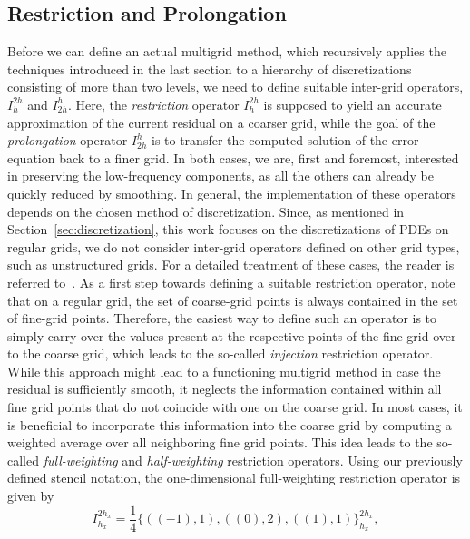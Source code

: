 \subsection{Restriction and Prolongation}
\label{subsec:restriction-and-prolongation}
Before we can define an actual multigrid method, which recursively applies the techniques introduced in the last section to a hierarchy of discretizations consisting of more than two levels, we need to define suitable inter-grid operators, $I_{h}^{2h}$ and $I_{2h}^{h}$.
Here, the \emph{restriction} operator $I_{h}^{2h}$ is supposed to yield an accurate approximation of the current residual on a coarser grid, while the goal of the \emph{prolongation} operator $I_{2h}^{h}$ is to transfer the computed solution of the error equation back to a finer grid.
In both cases, we are, first and foremost, interested in preserving the low-frequency components, as all the others can already be quickly reduced by smoothing.
In general, the implementation of these operators depends on the chosen method of discretization. 
Since, as mentioned in Section~\ref{sec:discretization}, this work focuses on the discretizations of PDEs on regular grids, we do not consider inter-grid operators defined on other grid types, such as unstructured grids.
For a detailed treatment of these cases, the reader is referred to~\cite{trottenberg2000multigrid,ruge1987algebraic,stuben2001introduction}.
As a first step towards defining a suitable restriction operator, note that on a regular grid, the set of coarse-grid points is always contained in the set of fine-grid points.
Therefore, the easiest way to define such an operator is to simply carry over the values present at the respective points of the fine grid over to the coarse grid, which leads to the so-called \emph{injection} restriction operator.
While this approach might lead to a functioning multigrid method in case the residual is sufficiently smooth, it neglects the information contained within all fine grid points that do not coincide with one on the coarse grid.
In most cases, it is beneficial to incorporate this information into the coarse grid by computing a weighted average over all neighboring fine grid points.
This idea leads to the so-called \emph{full-weighting} and \emph{half-weighting} restriction operators.
Using our previously defined stencil notation, the one-dimensional full-weighting restriction operator is given by
\begin{equation}
	I_{h_x}^{2 h_x} = \frac{1}{4}\{((-1), 1), ((0), 2), ((1), 1)\}_{h_x}^{2h_x},
\end{equation} 
